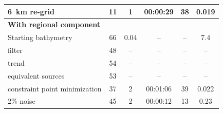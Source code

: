 \begin{table}[]
{\begin{tabular}{l|ccccc}
6~km re-grid                     & 11                                                 & 1                                                                 & 00:00:29                                                           & 38                   & 0.019                                                                \\ \hline
\textbf{With regional component} &                                                    &                                                                   &                                                                    &                      &                                                                      \\
Starting bathymetry              & 66                                                 & 0.04                                                              & –                                                                  & –                    & 7.4                                                                  \\
filter                           & 48                                                 & –                                                                 & –                                                                  & –                    & –                                                                    \\
trend                            & 54                                                 & –                                                                 & –                                                                  & –                    & –                                                                    \\
equivalent sources               & 53                                                 & –                                                                 & –                                                                  & –                    & –                                                                    \\
constraint point minimization    & 37                                                 & 2                                                                 & 00:01:06                                                           & 39                   & 0.022                                                                \\
2\% noise                        & 45                                                 & 2                                                                 & 00:00:12                                                           & 13                   & 0.23                                                                 \\

\end{tabular}}
\end{table}
